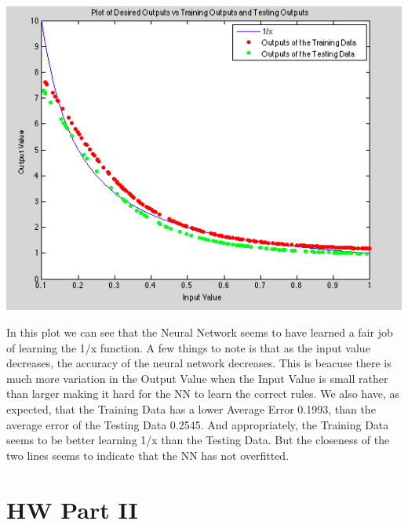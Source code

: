 \documentclass[epsfig]{article}
\begin{document}
\begin{center}
\includegraphics[scale=0.6]{pic2.png}
\end{center}
In this plot we can see that the Neural Network seems to have learned a fair job of learning the 1/x function. A few things to note is that as the input value decreases, the accuracy of the neural network decreases. This is beacuse there is much more variation in the Output Value when the Input Value is small rather than larger making it hard for the NN to learn the correct rules. We also have, as expected, that the Training Data has a lower Average Error 0.1993, than the average error of the Testing Data 0.2545.  And appropriately, the Training Data seems to be better learning 1/x than the Testing Data. But the closeness of the two lines seems to indicate that the NN has not overfitted. 
\newpage
 \section*{HW Part II}
\end{document}
